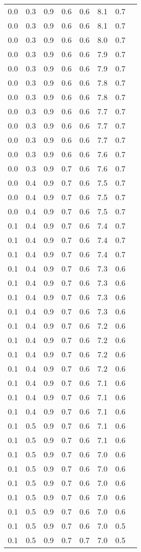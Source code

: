 \begin{tabular}{L{1in}|L{1in}|L{1in}|L{1in}|L{1in}|L{1in}|L{1in}|L{1in}}
0.0&0.3&0.9&0.6&0.6&8.1&0.7\\
0.0&0.3&0.9&0.6&0.6&8.1&0.7\\
0.0&0.3&0.9&0.6&0.6&8.0&0.7\\
0.0&0.3&0.9&0.6&0.6&7.9&0.7\\
0.0&0.3&0.9&0.6&0.6&7.9&0.7\\
0.0&0.3&0.9&0.6&0.6&7.8&0.7\\
0.0&0.3&0.9&0.6&0.6&7.8&0.7\\
0.0&0.3&0.9&0.6&0.6&7.7&0.7\\
0.0&0.3&0.9&0.6&0.6&7.7&0.7\\
0.0&0.3&0.9&0.6&0.6&7.7&0.7\\
0.0&0.3&0.9&0.6&0.6&7.6&0.7\\
0.0&0.3&0.9&0.7&0.6&7.6&0.7\\
0.0&0.4&0.9&0.7&0.6&7.5&0.7\\
0.0&0.4&0.9&0.7&0.6&7.5&0.7\\
0.0&0.4&0.9&0.7&0.6&7.5&0.7\\
0.1&0.4&0.9&0.7&0.6&7.4&0.7\\
0.1&0.4&0.9&0.7&0.6&7.4&0.7\\
0.1&0.4&0.9&0.7&0.6&7.4&0.7\\
0.1&0.4&0.9&0.7&0.6&7.3&0.6\\
0.1&0.4&0.9&0.7&0.6&7.3&0.6\\
0.1&0.4&0.9&0.7&0.6&7.3&0.6\\
0.1&0.4&0.9&0.7&0.6&7.3&0.6\\
0.1&0.4&0.9&0.7&0.6&7.2&0.6\\
0.1&0.4&0.9&0.7&0.6&7.2&0.6\\
0.1&0.4&0.9&0.7&0.6&7.2&0.6\\
0.1&0.4&0.9&0.7&0.6&7.2&0.6\\
0.1&0.4&0.9&0.7&0.6&7.1&0.6\\
0.1&0.4&0.9&0.7&0.6&7.1&0.6\\
0.1&0.4&0.9&0.7&0.6&7.1&0.6\\
0.1&0.5&0.9&0.7&0.6&7.1&0.6\\
0.1&0.5&0.9&0.7&0.6&7.1&0.6\\
0.1&0.5&0.9&0.7&0.6&7.0&0.6\\
0.1&0.5&0.9&0.7&0.6&7.0&0.6\\
0.1&0.5&0.9&0.7&0.6&7.0&0.6\\
0.1&0.5&0.9&0.7&0.6&7.0&0.6\\
0.1&0.5&0.9&0.7&0.6&7.0&0.6\\
0.1&0.5&0.9&0.7&0.6&7.0&0.5\\
0.1&0.5&0.9&0.7&0.7&7.0&0.5\\

\end{tabular}
